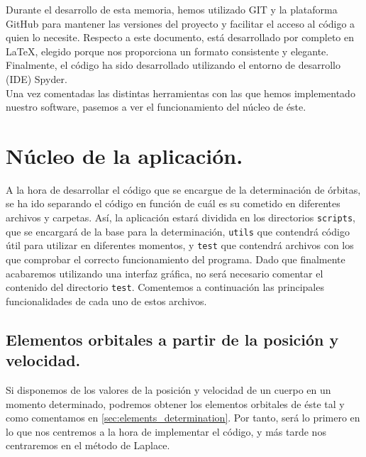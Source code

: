 \documentclass[11pt]{book}
\begin{document}
Durante el desarrollo de esta memoria, hemos utilizado GIT y la plataforma GitHub para mantener las versiones del proyecto y facilitar el acceso al código a quien lo necesite. Respecto a este documento, está desarrollado por completo en \LaTeX, elegido porque nos proporciona un formato consistente y elegante. Finalmente, el código ha sido desarrollado utilizando el entorno de desarrollo (IDE) Spyder.\\

Una vez comentadas las distintas herramientas con las que hemos implementado nuestro software, pasemos a ver el funcionamiento del núcleo de éste.\\

\section{Núcleo de la aplicación.}
\label{sec:kernel}
A la hora de desarrollar el código que se encargue de la determinación de órbitas, se ha ido separando el código en función de cuál es su cometido en diferentes archivos y carpetas. Así, la aplicación estará dividida en los directorios \texttt{scripts}, que se encargará de la base para la determinación, \texttt{utils} que contendrá código útil para utilizar en diferentes momentos, y \texttt{test} que contendrá archivos con los que comprobar el correcto funcionamiento del programa. Dado que finalmente acabaremos utilizando una interfaz gráfica, no será necesario comentar el contenido del directorio \texttt{test}. Comentemos a continuación las principales funcionalidades de cada uno de estos archivos.\\

\subsection{Elementos orbitales a partir de la posición y velocidad.}
\label{subsec:orbital_elements_code}
Si disponemos de los valores de la posición y velocidad de un cuerpo en un momento determinado, podremos obtener los elementos orbitales de éste tal y como comentamos en \ref{sec:elements_determination}. Por tanto, será lo primero en lo que nos centremos a la hora de implementar el código, y más tarde nos centraremos en el método de Laplace.\\
\end{document}
